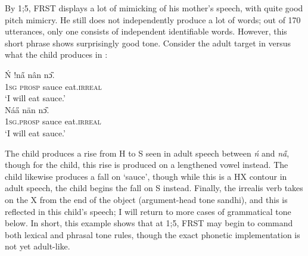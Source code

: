 \documentclass[output=paper,colorlinks,citecolor=brown,
]{langscibook}
\begin{document}
By 1;5, FRST displays a lot of mimicking of his mother's speech, with quite good pitch mimicry. He still does not independently produce a lot of words; out of 170 utterances, only one consists of independent identifiable words. However, this short phrase shows surprisingly good tone. Consider the adult target in  versus what the child produces in :

\ea\label{ex:mcpherson:adult-1-6}
\begin{xlist}
\ex\label{ex:mcpherson:adult-nnananno}
\gll Ń !na̋ nân nɔ̏. \\
\textsc{1sg} \textsc{prosp} sauce eat.\textsc{irreal} \\
\glt `I will eat sauce.' \\

\ex\label{ex:mcpherson:child-nnananno}
\gll Náa̋ nän nɔ̏. \\
\textsc{1sg.prosp} sauce eat.\textsc{irreal} \\
\glt `I will eat sauce.' 

\end{xlist}
\z

The child produces a rise from H to S seen in adult speech between \textit{ń} and \textit{na̋}, though for the child, this rise is produced on a lengthened vowel instead. The child likewise produces a fall on `sauce', though while this is a HX contour in adult speech, the child begins the fall on S instead. Finally, the irrealis verb takes on the X from the end of the object (argument-head tone sandhi), and this is reflected in this child's speech; I will return to more cases of grammatical tone below. In short, this example shows that at 1;5, FRST may begin to command both lexical and phrasal tone rules, though the exact phonetic implementation is not yet adult-like.
\end{document}

